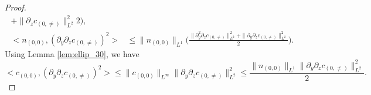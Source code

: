 \documentclass[12pt, reqno]{amsart}
\numberwithin{equation}{section}
\begin{document}
\begin{proof}
\begin{equation}
\begin{aligned}
{					+\|\partial_zc_{(0,\neq)}\|^2_{L^2}}{2}\Big),\\
				<n_{(0,0)},(\partial_y\partial_zc_{(0,\neq)})^2>
				&\leq \|n_{(0,0)}\|_{L^1}
				\Big(\frac{\|\partial_y^2\partial_zc_{(0,\neq)}\|_{L^2}^2
					+\|\partial_y\partial_zc_{(0,\neq)}\|^2_{L^2}}{2}\Big).
			\end{aligned}
		\end{equation}
		Using Lemma \ref{lem:ellip_30}, we have 
		\begin{equation}\label{cn_temp02}
			<c_{(0,0)},(\partial_y\partial_zc_{(0,\neq)})^2>
			\leq 	\|c_{(0,0)}\|_{L^{\infty}}
			\|\partial_y\partial_zc_{(0,\neq)}\|_{L^2}^2
			\leq \frac{\|n_{(0,0)}\|_{L^1}
				\|\partial_y\partial_zc_{(0,\neq)}\|_{L^2}^2}{2}.
		\end{equation}

\end{proof}
\end{document}
